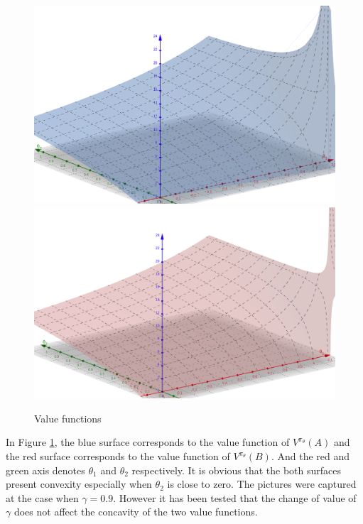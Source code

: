 \begin{Solution}
\begin{enumerate} [label=\alph*)]
        \begin{figure}[ht]
        \centering
        \includegraphics[scale = 0.2]{Assignment 2/figs/a.png} \qquad
        \includegraphics[scale = 0.2]{Assignment 2/figs/b.png}
        \caption{Value functions}
        \label{fig:4_a}
        \end{figure}
        
        In Figure \ref{fig:4_a}, the blue surface corresponds to the value function of $V^{\pi_\theta}(A)$ and the red surface corresponds to the value function of $V^{\pi_\theta}(B)$. And the red and green axis denotes $\theta_1$ and $\theta_2$ respectively. It is obvious that the both surfaces present convexity especially when $\theta_2$ is close to zero. The pictures were captured at the case when $\gamma = 0.9$. However it has been tested that the change of value of $\gamma$ does not affect the concavity of the two value functions.
        \vspace{1em}
        

\end{enumerate}
\end{Solution}

